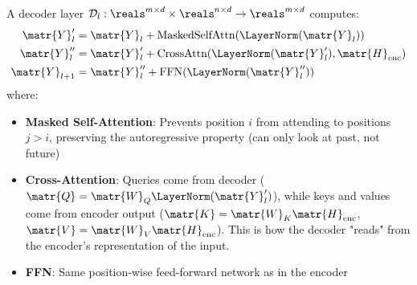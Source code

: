 \begin{definition}
  A decoder layer $\mathcal{D}_l: \reals^{m \times d} \times \reals^{n \times d} \to \reals^{m \times d}$ computes:
  \begin{align}
    \matr{Y}'_l &= \matr{Y}_l + \text{MaskedSelfAttn}(\LayerNorm(\matr{Y}_l)) \label{eq:dec_masked}\\
    \matr{Y}''_l &= \matr{Y}'_l + \text{CrossAttn}(\LayerNorm(\matr{Y}'_l), \matr{H}_{\text{enc}}) \label{eq:dec_cross}\\
    \matr{Y}_{l+1} &= \matr{Y}''_l + \text{FFN}(\LayerNorm(\matr{Y}''_l)) \label{eq:dec_ffn}
  \end{align}
  where:
  \begin{itemize}
    \item \textbf{Masked Self-Attention}: Prevents position $i$ from attending to positions $j > i$, preserving the autoregressive property (can only look at past, not future)
    \item \textbf{Cross-Attention}: Queries come from decoder ($\matr{Q} = \matr{W}_Q \LayerNorm(\matr{Y}'_l)$), while keys and values come from encoder output ($\matr{K} = \matr{W}_K \matr{H}_{\text{enc}}$, $\matr{V} = \matr{W}_V \matr{H}_{\text{enc}}$). This is how the decoder "reads" from the encoder's representation of the input.
    \item \textbf{FFN}: Same position-wise feed-forward network as in the encoder
  \end{itemize}
\end{definition}

